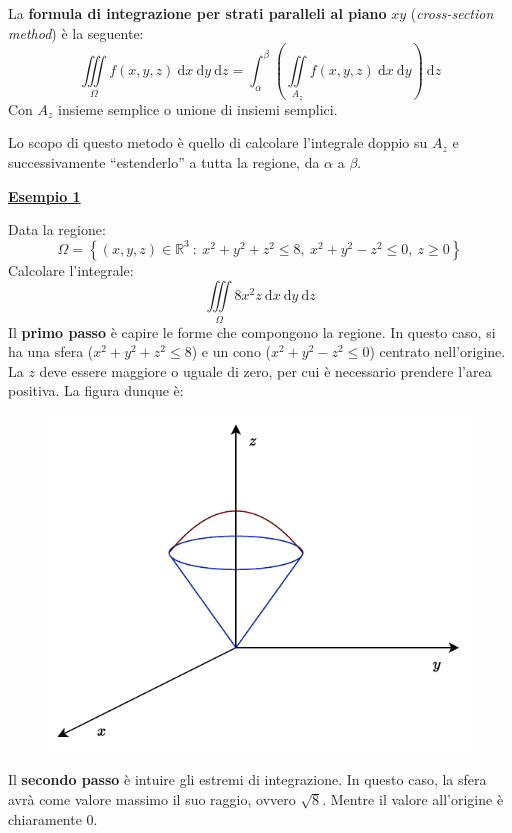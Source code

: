 \documentclass[a4paper]{article}
\newcommand{\dquotes}[1]{``#1''}
\newcommand{\definition}[1]{\textcolor{Red3}{\textbf{#1}}}
\newcommand{\example}[1]{\textcolor{Green4}{\textbf{#1}}}
\begin{document}
	\begin{boxdef}
		La \definition{formula di integrazione per strati paralleli al piano} $xy$ (\emph{cross-section method}) è la seguente:
		\begin{equation}\label{eq: formula di integrazione per strati}
			\displaystyle\iiint\limits_{\Omega} f\left(x,y,z\right) \:\mathrm{d}x\:\mathrm{d}y\:\mathrm{d}z = \displaystyle\int_{\alpha}^{\beta}\left(\iint\limits_{A_{z}} f\left(x,y,z\right) \:\mathrm{d}x\:\mathrm{d}y\right) \:\mathrm{d}z
		\end{equation}
		Con $A_{z}$ insieme semplice o unione di insiemi semplici.
	\end{boxdef}

	\noindent
	Lo scopo di questo metodo è quello di calcolare l'integrale doppio su $A_{z}$ e successivamente \dquotes{estenderlo} a tutta la regione, da $\alpha$ a $\beta$.\newpage

	\begin{flushleft}
		\example{\underline{Esempio 1}}
	\end{flushleft}
	Data la regione:
	\begin{equation*}
		\Omega = \left\{\left(x,y,z\right) \in \mathbb{R}^{3} \: : \: x^{2} + y^{2} + z^{2} \le 8, \: x^{2} + y^{2} - z^{2} \le 0, \: z \ge 0\right\}
	\end{equation*}
	Calcolare l'integrale:
	\begin{equation*}
		\displaystyle\iiint\limits_{\Omega} 8x^{2}z \:\mathrm{d}x\:\mathrm{d}y\:\mathrm{d}z
	\end{equation*}
	Il \textbf{primo passo} è capire le forme che compongono la regione. In questo caso, si ha una sfera ($x^{2} + y^{2} + z^{2} \le 8$) e un cono ($x^{2} + y^{2} - z^{2} \le 0$) centrato nell'origine. La $z$ deve essere maggiore o uguale di zero, per cui è necessario prendere l'area positiva. La figura dunque è:
	\begin{figure}[!htp]
		\centering
		\includegraphics[width=.7\textwidth]{img/integrazione_per_strati.pdf}
	\end{figure}
	Il \textbf{secondo passo} è intuire gli estremi di integrazione. In questo caso, la sfera avrà come valore massimo il suo raggio, ovvero $\sqrt{8}$. Mentre il valore all'origine è chiaramente $0$.
\end{document}
